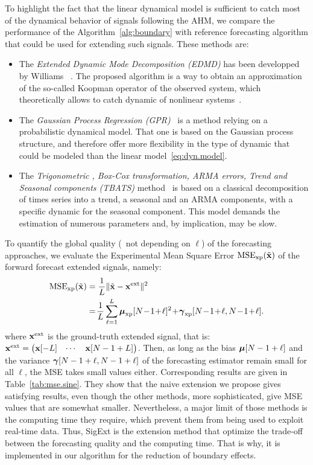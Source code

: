 To highlight the fact that the linear dynamical model is sufficient to catch most of the dynamical behavior of signals following the AHM, we compare the performance of the Algorithm~\ref{alg:boundary} with reference forecasting algorithm that could be used for extending such signals. These methods are:
\begin{itemize}
\item The \emph{Extended Dynamic Mode Decomposition (EDMD)} has been developped by Williams \etal~\cite{Williams15data}. The proposed algorithm is a way to obtain an approximation of the so-called Koopman operator of the observed system, which theoretically allows to catch dynamic of nonlinear systems~\cite{Korda18linear}.
\item The \emph{Gaussian Process Regression (GPR)}~\cite{Rasmussen06gaussian} is a method relying on a probabilistic dynamical model. That one is based on the Gaussian process structure, and therefore offer more flexibility in the type of dynamic that could be modeled than the linear model~\eqref{eq:dyn.model}.
\item The \emph{Trigonometric , Box-Cox transformation, ARMA errors, Trend and Seasonal components (TBATS)} method~\cite{Rasmussen06gaussian} is based on a classical decomposition of times series into a trend, a seasonal and an ARMA components, with a specific dynamic for the seasonal component. This model demands the estimation of numerous parameters and, by implication, may be slow. 
\end{itemize}

To quantify the global quality (\ie~not depending on $\ell$) of the forecasting approaches, we evaluate the Experimental Mean Square Error $\mathrm{MSE_{xp}}(\tilde{{\mathbf x}})$ of the forward forecast extended signals, namely:
\begin{align}
\label{eq:mse}
\mathrm{MSE_{\xp}}(\tilde\bx) &= \dfrac1{L}\|\tilde\bx -\bx^\mathrm{ext}\|^2 \\
\nonumber
&=\! \dfrac1{L}\sum_{\ell=1}^L \bmu_{\xp}[N\!-\!1\!+\!\ell]^2 \!+\! \bgamma_{\xp}[N\!-\!1\!+\!\ell,N\!-\!1\!+\!\ell] .
\end{align}
where ${\mathbf x}^\mathrm{ext}$ is the ground-truth extended signal, that is: ${\mathbf x}^\mathrm{ext} = \begin{pmatrix}{\mathbf x}[-L] & \cdots & {\mathbf x}[N-1+L] \end{pmatrix}$. Then, as long as the bias $\boldsymbol{\mu}[N-1+\ell]$ and the variance $\boldsymbol{\gamma}[N-1+\ell,N-1+\ell]$ of the forecasting estimator remain small for all $\ell$, the MSE takes small values either. Corresponding results are given in Table~\ref{tab:mse.sine}. They show that the naive extension we propose gives satisfying results, even though the other methods, more sophisticated, give MSE values that are somewhat smaller. Nevertheless, a major limit of those methods is the computing time they require, which prevent them from being used to exploit real-time data. Thus, {\sf SigExt} is the extension method that optimize the trade-off between the forecasting quality and the computing time. That is why, it is implemented in our algorithm for the reduction of boundary effects.

